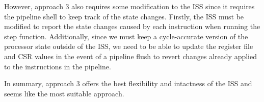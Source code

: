 However, approach 3 also requires some modification to the ISS since it requires the pipeline shell to keep track of the state changes. Firstly, the ISS must be modified to report the state changes caused by each instruction when running the step function. Additionally, since we must keep a cycle-accurate version of the processor state outside of the ISS, we need to be able to update the register file and CSR values in the event of a pipeline flush to revert changes already applied to the instructions in the pipeline.

In summary, approach 3 offers the best flexibility and intactness of the ISS and seems like the most suitable approach.

%
%
%



%
%
%
%
%
%
%
%






%
%

